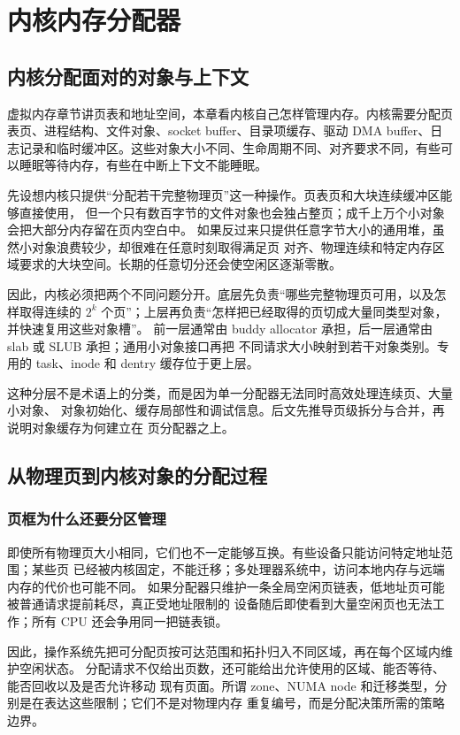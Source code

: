 \chapter{内核内存分配器}

\section{内核分配面对的对象与上下文}

虚拟内存章节讲页表和地址空间，本章看内核自己怎样管理内存。内核需要分配页表页、进程结构、文件对象、socket buffer、目录项缓存、驱动 DMA buffer、日志记录和临时缓冲区。这些对象大小不同、生命周期不同、对齐要求不同，有些可以睡眠等待内存，有些在中断上下文不能睡眠。

先设想内核只提供“分配若干完整物理页”这一种操作。页表页和大块连续缓冲区能够直接使用，
但一个只有数百字节的文件对象也会独占整页；成千上万个小对象会把大部分内存留在页内空白中。
如果反过来只提供任意字节大小的通用堆，虽然小对象浪费较少，却很难在任意时刻取得满足页
对齐、物理连续和特定内存区域要求的大块空间。长期的任意切分还会使空闲区逐渐零散。

因此，内核必须把两个不同问题分开。底层先负责“哪些完整物理页可用，以及怎样取得连续的
$2^k$ 个页”；上层再负责“怎样把已经取得的页切成大量同类型对象，并快速复用这些对象槽”。
前一层通常由 buddy allocator 承担，后一层通常由 slab 或 SLUB 承担；通用小对象接口再把
不同请求大小映射到若干对象类别。专用的 task、inode 和 dentry 缓存位于更上层。

这种分层不是术语上的分类，而是因为单一分配器无法同时高效处理连续页、大量小对象、
对象初始化、缓存局部性和调试信息。后文先推导页级拆分与合并，再说明对象缓存为何建立在
页分配器之上。

\section{从物理页到内核对象的分配过程}

\subsection{页框为什么还要分区管理}

即使所有物理页大小相同，它们也不一定能够互换。有些设备只能访问特定地址范围；某些页
已经被内核固定，不能迁移；多处理器系统中，访问本地内存与远端内存的代价也可能不同。
如果分配器只维护一条全局空闲页链表，低地址页可能被普通请求提前耗尽，真正受地址限制的
设备随后即使看到大量空闲页也无法工作；所有 CPU 还会争用同一把链表锁。

因此，操作系统先把可分配页按可达范围和拓扑归入不同区域，再在每个区域内维护空闲状态。
分配请求不仅给出页数，还可能给出允许使用的区域、能否等待、能否回收以及是否允许移动
现有页面。所谓 zone、NUMA node 和迁移类型，分别是在表达这些限制；它们不是对物理内存
重复编号，而是分配决策所需的策略边界。

